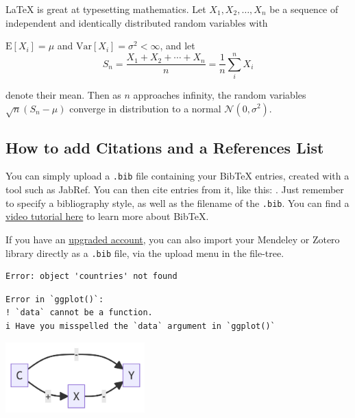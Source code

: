 \documentclass[
  12pt,
  letterpaper,
  DIV=11,
  numbers=noendperiod]{scrartcl}
\begin{document}
\LaTeX{} is great at typesetting mathematics. Let
\(X_1, X_2, \ldots, X_n\) be a sequence of independent and identically
distributed random variables with

\(\text{E}[X_i] = \mu\) and \(\text{Var}[X_i] = \sigma^2 < \infty\), and
let
\[S_n = \frac{X_1 + X_2 + \cdots + X_n}{n} = \frac{1}{n}\sum_{i}^{n} X_i\]

denote their mean. Then as \(n\) approaches infinity, the random
variables \(\sqrt{n}(S_n - \mu)\) converge in distribution to a normal
\(\mathcal{N}(0, \sigma^2)\).

\subsection{How to add Citations and a References List}

You can simply upload a \verb|.bib| file containing your BibTeX entries,
created with a tool such as JabRef. You can then cite entries from it,
like this: \cite{greenwade93}. Just remember to specify a bibliography
style, as well as the filename of the \verb|.bib|. You can find a
\href{https://www.overleaf.com/help/97-how-to-include-a-bibliography-using-bibtex}{video tutorial here}
to learn more about BibTeX.

If you have an
\href{https://www.overleaf.com/user/subscription/plans}{upgraded account},
you can also import your Mendeley or Zotero library directly as a
\verb|.bib| file, via the upload menu in the file-tree.

\begin{verbatim}
Error: object 'countries' not found
\end{verbatim}

\begin{verbatim}
Error in `ggplot()`:
! `data` cannot be a function.
i Have you misspelled the `data` argument in `ggplot()`
\end{verbatim}

\includegraphics[width=2.11in,height=1.07in]{example_files/figure-latex/mermaid-figure-1.png}


  
\end{document}
